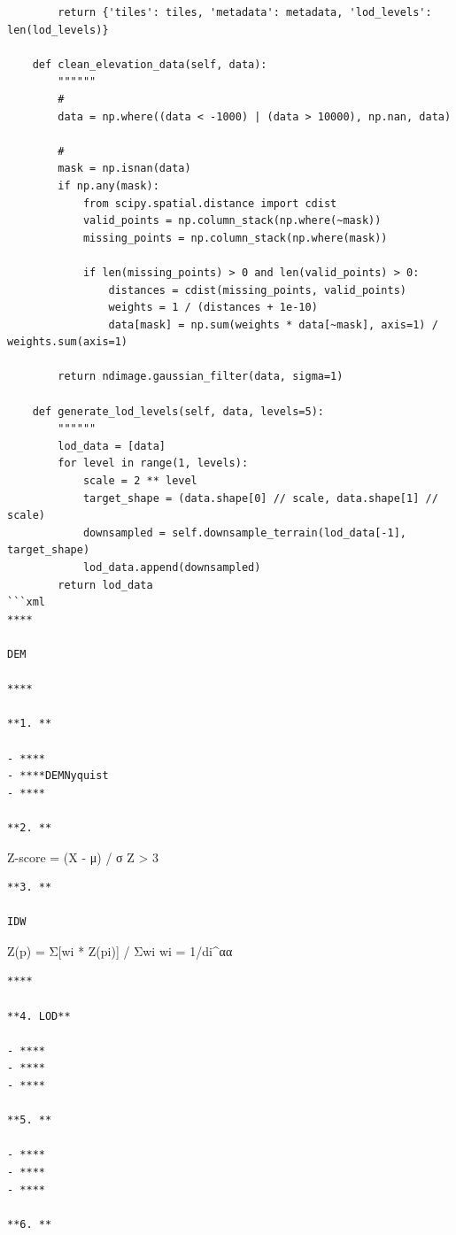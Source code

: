 \begin{verbatim}
        return {'tiles': tiles, 'metadata': metadata, 'lod_levels': len(lod_levels)}
    
    def clean_elevation_data(self, data):
        """"""
        # 
        data = np.where((data < -1000) | (data > 10000), np.nan, data)
        
        # 
        mask = np.isnan(data)
        if np.any(mask):
            from scipy.spatial.distance import cdist
            valid_points = np.column_stack(np.where(~mask))
            missing_points = np.column_stack(np.where(mask))
            
            if len(missing_points) > 0 and len(valid_points) > 0:
                distances = cdist(missing_points, valid_points)
                weights = 1 / (distances + 1e-10)
                data[mask] = np.sum(weights * data[~mask], axis=1) / weights.sum(axis=1)
                
        return ndimage.gaussian_filter(data, sigma=1)
    
    def generate_lod_levels(self, data, levels=5):
        """"""
        lod_data = [data]
        for level in range(1, levels):
            scale = 2 ** level
            target_shape = (data.shape[0] // scale, data.shape[1] // scale)
            downsampled = self.downsample_terrain(lod_data[-1], target_shape)
            lod_data.append(downsampled)
        return lod_data
```xml
****

DEM

****

**1. **

- ****
- ****DEMNyquist
- ****

**2. **
\end{verbatim}

Z-score = (X - μ) / σ \textbar Z\textbar{} \textgreater{} 3

\begin{verbatim}
**3. **

IDW
\end{verbatim}

Z(p) = Σ{[}wi * Z(pi){]} / Σwi wi = 1/di\^{}αα

\begin{verbatim}
****

**4. LOD**

- ****
- ****
- ****

**5. **

- ****
- ****
- ****

**6. **
\end{verbatim}

